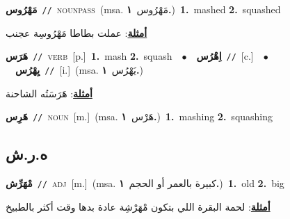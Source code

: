\documentclass[10pt,a4paper,twoside]{article} %
\begin{document}
\begin{multicols}{2}
{\setlength\topsep{0pt}\textbf{\foreignlanguage{arabic}{مَهْرُوس}}\ {\color{gray}\texttt{//}\color{black}}\ \textsc{noun\textunderscore pass}\ \color{gray}(msa. \foreignlanguage{arabic}{مَهْرُوس}~\foreignlanguage{arabic}{\textbf{١.}})\color{black}\ \textbf{1.}~mashed  \textbf{2.}~squashed\  \begin{flushright}\color{gray}\foreignlanguage{arabic}{\textbf{\underline{\foreignlanguage{arabic}{أمثلة}}}: عملت بطاطا مَهْرُوسِة عجنب}\end{flushright}\color{black}} \vspace{2mm}

{\setlength\topsep{0pt}\textbf{\foreignlanguage{arabic}{هَرَس}}\ {\color{gray}\texttt{//}\color{black}}\ \textsc{verb}\ [p.]\ \textbf{1.}~mash  \textbf{2.}~squash\ \ $\bullet$\ \ \setlength\topsep{0pt}\textbf{\foreignlanguage{arabic}{اِهْرُس}}\ {\color{gray}\texttt{//}\color{black}}\ [c.]\ \ $\bullet$\ \ \setlength\topsep{0pt}\textbf{\foreignlanguage{arabic}{يِهْرُس}}\ {\color{gray}\texttt{//}\color{black}}\ [i.]\ \color{gray}(msa. \foreignlanguage{arabic}{يَهْرُس}~\foreignlanguage{arabic}{\textbf{١.}})\color{black}\  \begin{flushright}\color{gray}\foreignlanguage{arabic}{\textbf{\underline{\foreignlanguage{arabic}{أمثلة}}}: هَرَسَتُه الشاحنة}\end{flushright}\color{black}} \vspace{2mm}

{\setlength\topsep{0pt}\textbf{\foreignlanguage{arabic}{هَرِس}}\ {\color{gray}\texttt{//}\color{black}}\ \textsc{noun}\ [m.]\ \color{gray}(msa. \foreignlanguage{arabic}{هَرْس}~\foreignlanguage{arabic}{\textbf{١.}})\color{black}\ \textbf{1.}~mashing  \textbf{2.}~squashing\ } \vspace{2mm}

\vspace{-3mm}
\subsection*{\color{blue}\foreignlanguage{arabic}{ه.ر.ش}\color{blue}{}} 

{\setlength\topsep{0pt}\textbf{\foreignlanguage{arabic}{مْهَرِّش}}\ {\color{gray}\texttt{//}\color{black}}\ \textsc{adj}\ [m.]\ \color{gray}(msa. \foreignlanguage{arabic}{كبيرة بالعمر أو الحجم}~\foreignlanguage{arabic}{\textbf{١.}})\color{black}\ \textbf{1.}~old  \textbf{2.}~big\  \begin{flushright}\color{gray}\foreignlanguage{arabic}{\textbf{\underline{\foreignlanguage{arabic}{أمثلة}}}: لحمة البقرة اللي بتكون مْهَرْشِة عادة بدها وقت أكثر بالطبيخ}\end{flushright}\color{black}} \vspace{2mm}


\end{multicols}
\end{document}
